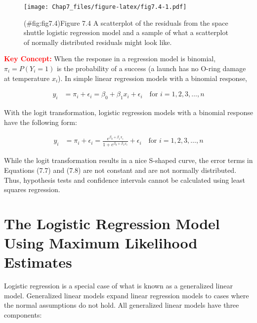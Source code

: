 \documentclass[
]{report}
\begin{document}
\begin{figure}
\centering
\texttt{[image: Chap7\_files/figure-latex/fig7.4-1.pdf]}
\caption{(\#fig:fig7.4)Figure 7.4 A scatterplot of the residuals from the space shuttle logistic regression model and a sample of what a scatterplot of normally distributed residuals might look like.}
\end{figure}

\Large

\textbf{\textcolor{red}{Key Concept:}}
\color{red}
When the response in a regression model is binomial, \(\pi_i = P(Y_i = 1)\) is the probability of a success (a launch has no O-ring damage at temperature \(x_i\)). In simple linear regression models with a binomial response,

\begin{align}
y_i &= \pi_i + \epsilon_i = \beta_0 + \beta_1 x_i + \epsilon_i \quad \text{for } i = 1,2,3,\dots,n \tag{7.7}
\end{align}

With the logit transformation, logistic regression models with a binomial response have the following form:

\begin{align}
y_i &= \pi_i + \epsilon_i = \frac{e^{\beta_0 + \beta_1 x_i}}{1 + e^{\beta_0 + \beta_1 x_i}} + \epsilon_i \quad \text{for } i = 1,2,3,\dots,n \tag{7.8}
\end{align}

While the logit transformation results in a nice S-shaped curve, the error terms in Equations (7.7) and (7.8) are not constant and are not normally distributed. Thus, hypothesis tests and confidence intervals cannot be calculated using least squares regression.
\color{black}
\normalsize

\section{\texorpdfstring{\textbf{The Logistic Regression Model Using Maximum Likelihood Estimates}}{The Logistic Regression Model Using Maximum Likelihood Estimates}}\label{the-logistic-regression-model-using-maximum-likelihood-estimates}

Logistic regression is a special case of what is known as a generalized linear model. Generalized linear models expand linear regression models to cases where the normal assumptions do not hold. All generalized linear models have three components:
\end{document}
